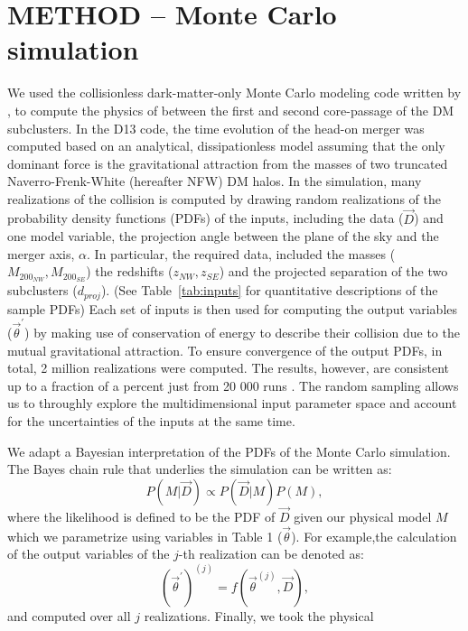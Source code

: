 \section{METHOD -- Monte Carlo simulation} 
We used the collisionless 
dark-matter-only Monte Carlo modeling code written by , to compute the physics of between
the first and second core-passage of the DM subclusters. 
In the D13 code, the time evolution of the
head-on merger was computed based on an analytical, dissipationless model
assuming that the only dominant force is the gravitational attraction from
the masses of two truncated Naverro-Frenk-White (hereafter NFW) DM halos. 
In the simulation, many realizations of the collision is
computed by drawing random realizations of the probability density
functions (PDFs) of the inputs, including
the data ($\vec{D}$) and one model variable, the projection angle between
the plane of the sky and the merger axis, $\alpha$. In particular,
the required data, included the masses ($M_{200_{NW}},M_{200_{SE}}$) the
redshifts ($z_{NW}, z_{SE}$) and the projected separation of the two
subclusters ($d_{proj}$).  (See Table~\ref{tab:inputs}
for quantitative descriptions of the sample PDFs) 
Each set of inputs is then used for computing the output variables
($\vec{\theta}^\prime$) by making use of conservation of energy to describe
their collision due to the mutual gravitational attraction.
To ensure convergence of the output PDFs, in total, 2 million realizations
were computed. 
The results, however, are consistent up to a fraction of a percent just
from 20 000 runs . The random sampling allows us to
throughly explore the multidimensional input parameter space and account
for the uncertainties of the inputs at the same time.
\par    
We adapt a Bayesian interpretation of the PDFs of the Monte Carlo
simulation. The Bayes chain rule that underlies the simulation can be written as:
\begin{equation}
    P(M|\vec{D}) \propto P(\vec{D}|M)P(M),
\end{equation}
where the likelihood is defined to be the PDF of $\vec{D}$ given our
physical model $M$ which we parametrize using variables in Table 1
($\vec{\theta}$).
For example,the
calculation of the output variables of the $j$-th realization can be denoted as: 
\begin{equation}
    (\vec{\theta}^\prime)^{(j)} = f(\vec{\theta}^{(j)}, \vec{D}), 
\end{equation}    
and computed over all $j$ realizations. Finally, we took the physical
